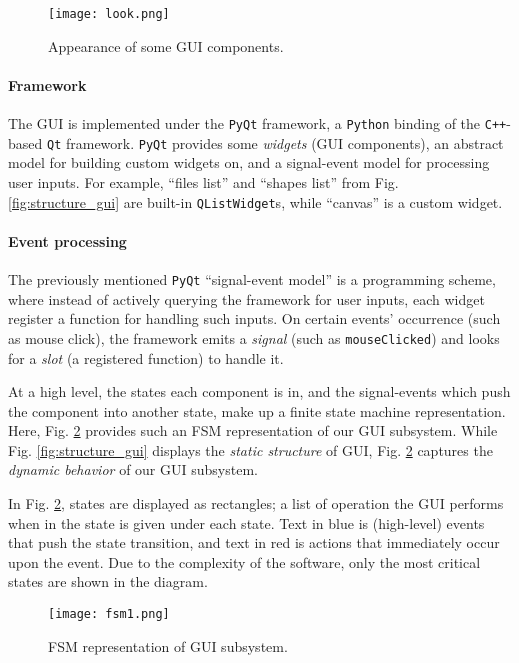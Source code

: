 \begin{figure}[htbp!]
    \centering
    \texttt{[image: look.png]}
    \caption{Appearance of some GUI components.}
    \label{fig:look_gui}
\end{figure}

\paragraph{Framework} The GUI is implemented under the \texttt{PyQt} framework, a \texttt{Python} binding of the \texttt{C++}-based \texttt{Qt} framework. \texttt{PyQt} provides some \textit{widgets} (GUI components), an abstract model for building custom widgets on, and a signal-event model for processing user inputs. For example, ``files list'' and ``shapes list'' from Fig. \ref{fig:structure_gui} are built-in \texttt{QListWidget}s, while ``canvas'' is a custom widget.

\paragraph{Event processing} The previously mentioned \texttt{PyQt} ``signal-event model'' is a programming scheme, where instead of actively querying the framework for user inputs, each widget register a function for handling such inputs. On certain events' occurrence (such as mouse click), the framework emits a \textit{signal} (such as \texttt{mouseClicked}) and looks for a \textit{slot} (a registered function) to handle it. 

At a high level, the states each component is in, and the signal-events which push the component into another state, make up a finite state machine representation. Here, Fig. \ref{fig:fsm_gui} provides such an FSM representation of our GUI subsystem. While Fig. \ref{fig:structure_gui} displays the \textit{static structure} of GUI, Fig. \ref{fig:fsm_gui} captures the \textit{dynamic behavior} of our GUI subsystem.

In Fig. \ref{fig:fsm_gui}, states are displayed as rectangles; a list of operation the GUI performs when in the state is given under each state. Text in blue is (high-level) events that push the state transition, and text in red is actions that immediately occur upon the event. Due to the complexity of the software, only the most critical states are shown in the diagram.

\begin{figure}[htbp!]
    \centering
    \texttt{[image: fsm1.png]}
    \caption{FSM representation of GUI subsystem.}
    \label{fig:fsm_gui}
\end{figure}


